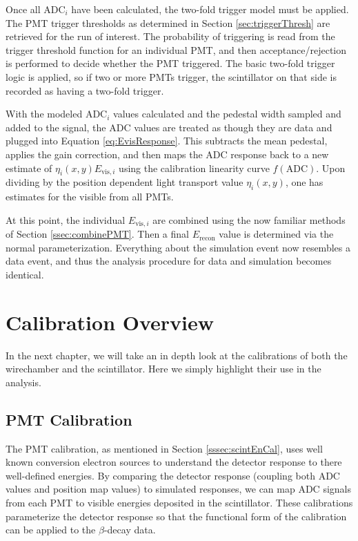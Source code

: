 Once all $\mathrm{ADC}_i$ have been calculated, the two-fold trigger model must be applied.
The PMT trigger thresholds as determined in Section \ref{sec:triggerThresh} are retrieved for the run of interest.
The probability of triggering is read from the trigger threshold function for an individual PMT, and then
acceptance/rejection is performed to decide whether the PMT triggered. The basic two-fold trigger logic is
applied, so if two or more PMTs trigger, the scintillator on that side is recorded as having a two-fold trigger.

With the modeled $\mathrm{ADC}_i$ values calculated and the pedestal width sampled and added to the signal, the ADC values
are treated as though they are data and plugged into Equation \ref{eq:EvisResponse}. This subtracts the mean pedestal,
applies the gain correction, and then maps the ADC response back to a new estimate of $\eta_i(x,y) E_{\mathrm{vis},i}$
using the calibration linearity curve $f(\mathrm{ADC})$. Upon dividing by the position dependent light transport
value $\eta_i(x,y)$, one has estimates for the visible from all PMTs.

At this point, the individual $E_{\mathrm{vis},i}$ are combined using the now familiar methods of Section \ref{ssec:combinePMT}.
Then a final $E_{\mathrm{recon}}$ value is determined via the normal parameterization. Everything about the simulation event
now resembles a data event, and thus the analysis procedure for data and simulation becomes identical.






\section{Calibration Overview}

In the next chapter, we will take an in depth look at the calibrations of both
the wirechamber and the scintillator. Here we simply highlight their use in the analysis.

\subsection{PMT Calibration} \label{ssec:PMTCal}

The PMT calibration, as mentioned in Section \ref{sssec:scintEnCal},
uses well known conversion electron sources
to understand the detector response to there well-defined energies. By comparing the detector
response (coupling both ADC values and position map values) to simulated responses,
we can map ADC signals from each PMT to visible energies deposited
in the scintillator. These calibrations parameterize the detector response so that the
functional form of the calibration can be applied to the $\beta$-decay data.

